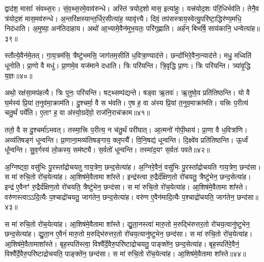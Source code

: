 द्वाद॑श॒ मासाः᳚ संवथ्स॒रः। 
सं॒व॒थ्स॒रमे॒वाव॑रुन्धे। 
अस्ति॑ त्रयोद॒शो मास॒ इत्या॑हुः। 
यत्त्र॑योद॒शः प॑रि॒धिर्भव॑ति। 
तेनै॒व त्र॑योद॒शं मास॒मव॑रुन्धे। 
अ॒न्तरि॑क्षस्यान्त॒र्धिर॒सीत्या॑ह॒ व्यावृ॑त्त्यै। 
दिवं॒ तप॑सस्त्राय॒स्वेत्यु॒परि॑ष्टा॒द्धिर॑ण्य॒मधि॒ निद॑धाति। 
अ॒मुष्या॒ अन॑तिदाहाय। 
अथो॑ आ॒भ्यामे॒वैन॑मुभ॒यतः॒ परि॑गृह्णाति। 
अर्\mbox{}ह॑न् बिभर्\mbox{}षि॒ साय॑कानि॒ धन्वेत्या॑ह॥३९॥

स्तौत्ये॒वैन॑मे॒तत्। 
गा॒य॒त्रम॑सि॒ त्रैष्टु॑भमसि॒ जाग॑तम॒सीति॑ ध॒वित्रा॒ण्याद॑त्ते। 
छन्दो॑भिरे॒वैना॒न्याद॑त्ते। 
मधु॒ मध्विति॑ धूनोति। 
प्रा॒णो वै मधु॑। 
प्रा॒णमे॒व यज॑माने दधाति। 
त्रिः परि॑यन्ति। 
त्रि॒वृद्धि प्रा॒णः। 
त्रिः परि॑यन्ति। 
त्र्या॑वृ॒द्धि य॒ज्ञः॥४०॥

अथो॒ रक्ष॑सा॒मप॑हत्यै। 
त्रिः पुनः॒ परि॑यन्ति। 
षट्थ्सम्प॑द्यन्ते। 
षड्वा ऋ॒तवः॑। 
ऋ॒तुष्वे॒व प्रति॑तिष्ठन्ति। 
यो वै घ॒र्मस्य॑ प्रि॒यां त॒नुव॑मा॒क्राम॑ति। 
दु॒श्चर्मा॒ वै स भ॑वति। 
ए॒ष ह॒ वा अ॑स्य प्रि॒यां त॒नुव॒माक्रा॑मति। 
यत्त्रिः प॒रीत्य॑ चतु॒र्थं पर्ये॑ति। 
ए॒ताꣳ ह॒ वा अ॑स्यो॒ग्रदे॑वो॒ राज॑नि॒राच॑क्राम॥४१॥

ततो॒ वै स दु॒श्चर्मा॑ऽभवत्। 
तस्मा॒त्त्रिः प॒रीत्य॒ न च॑तु॒र्थं परी॑यात्। 
आ॒त्मनो॑ गोपी॒थाय॑। 
प्रा॒णा वै ध॒वित्रा॑णि। 
अव्य॑तिषङ्गं धून्वन्ति। 
प्रा॒णाना॒मव्य॑तिषङ्गाय॒ क्लृप्त्यै᳚। 
वि॒नि॒षद्य॑ धून्वन्ति। 
दि॒क्ष्वे॑व प्रति॑तिष्ठन्ति। 
ऊ॒र्ध्वं धू᳚न्वन्ति। 
सु॒व॒र्गस्य॑ लो॒कस्य॒ सम॑ष्ट्यै। 
स॒र्वतो॑ धून्वन्ति। 
तस्मा॑द॒यꣳ स॒र्वतः॑ पवते॥४२॥
\anuvakamend[द॒धा॒ती॒वान्वा॑ह य॒ज्ञस्या॑है॒ष उ॒परि॑ष्टादाशीर॒न्यो व्या᳚स्था॒पय॑न्ति र॒श्मयो॑ भवन्ति॒ धन्वेत्या॑ह य॒ज्ञश्च॑क्राम॒ सम॑ष्ट्यै॒ द्वे च॑]

अ॒ग्निष्ट्वा॒ वसु॑भिः पु॒रस्ता᳚द्रोचयतु गाय॒त्रेण॒ छन्द॒सेत्या॑ह। 
अ॒ग्निरे॒वैनं॒ वसु॑भिः पु॒रस्ता᳚द्रोचयति गाय॒त्रेण॒ छन्द॑सा। 
स मा॑ रुचि॒तो रो॑च॒येत्या॑ह। 
आ॒शिष॑मे॒वैतामा शा᳚स्ते। 
इन्द्र॑स्त्वा रु॒द्रैर्द॑क्षिण॒तो रो॑चयतु॒ त्रैष्टु॑भेन॒ छन्द॒सेत्या॑ह। 
इन्द्र॑ ए॒वैनꣳ॑ रु॒द्रैर्द॑क्षिण॒तो रो॑चयति॒ त्रैष्टु॑भेन॒ छन्द॑सा। 
स मा॑ रुचि॒तो रो॑च॒येत्या॑ह। 
आ॒शिष॑मे॒वैतामा शा᳚स्ते। 
वरु॑णस्त्वाऽऽदि॒त्यैः प॒श्चाद्रो॑चयतु॒ जाग॑तेन॒ छन्द॒सेत्या॑ह। 
वरु॑ण ए॒वैन॑मादि॒त्यैः प॒श्चाद्रो॑चयति॒ जाग॑तेन॒ छन्द॑सा॥४३॥

स मा॑ रुचि॒तो रो॑च॒येत्या॑ह। 
आ॒शिष॑मे॒वैतामा शा᳚स्ते। 
द्यु॒ता॒नस्त्वा॑ मारु॒तो म॒रुद्भि॑रुत्तर॒तो रो॑चय॒त्वानु॑ष्टुभेन॒ छन्द॒सेत्या॑ह। 
द्यु॒ता॒न ए॒वैनं॑ मारु॒तो म॒रुद्भि॑रुत्तर॒तो रो॑चय॒त्यानु॑ष्टुभेन॒ छन्द॑सा। 
स मा॑ रुचि॒तो रो॑च॒येत्या॑ह। 
आ॒शिष॑\-मे॒वैतामाशा᳚स्ते। 
बृह॒स्पति॑स्त्वा॒ विश्वै᳚र्दे॒वैरु॒परि॑ष्टा\-द्रोचयतु॒ पाङ्क्ते॑न॒ छन्द॒सेत्या॑ह। 
बृह॒स्पति॑रे॒वैनं॒  विश्वै᳚र्दे॒वै\-रु॒परि॑ष्टाद्रोचयति॒ पाङ्क्ते॑न॒ छन्द॑सा। 
स मा॑ रुचि॒तो रो॑च॒येत्या॑ह। 
आ॒शिष॑मे॒वैतामा शा᳚स्ते॥४४॥

